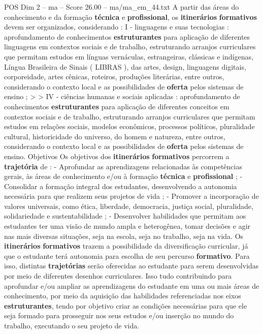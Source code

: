 \begin{textsample}{POS Dim 2 – ma – Score 26.00 – ma/ma\_em\_44.txt}
A partir das áreas do conhecimento e da formação \textbf{técnica} e \textbf{profissional}, os \textbf{itinerários} \textbf{formativos} devem ser organizados, considerando : I - linguagens e suas tecnologias : aprofundamento de conhecimentos \textbf{estruturantes} para aplicação de diferentes linguagens em contextos sociais e de trabalho, estruturando arranjos curriculares que permitam estudos em línguas vernáculas, estrangeiras, clássicas e indígenas, Língua Brasileira de Sinais ( LIBRAS ), das artes, design, linguagens digitais, corporeidade, artes cênicas, roteiros, produções literárias, entre outros, considerando o contexto local e as possibilidades de \textbf{oferta} pelos sistemas de ensino ; > > IV - ciências humanas e sociais aplicadas : aprofundamento de conhecimentos \textbf{estruturantes} para aplicação de diferentes conceitos em contextos sociais e de trabalho, estruturando arranjos curriculares que permitam estudos em relações sociais, modelos econômicos, processos políticos, pluralidade cultural, historicidade do universo, do homem e natureza, entre outros, considerando o contexto local e as possibilidades de \textbf{oferta} pelos sistemas de ensino.
Objetivos Os objetivos dos \textbf{itinerários} \textbf{formativos} percorrem a \textbf{trajetória} de : - Aprofundar as aprendizagens relacionadas às competências gerais, às áreas de conhecimento e/ou à formação \textbf{técnica} e \textbf{profissional} ; - Consolidar a formação integral dos estudantes, desenvolvendo a autonomia necessária para que realizem seus projetos de vida ; - Promover a incorporação de valores universais, como ética, liberdade, democracia, justiça social, pluralidade, solidariedade e sustentabilidade ; - Desenvolver habilidades que permitam aos estudantes ter uma visão de mundo ampla e heterogênea, tomar decisões e agir nas mais diversas situações, seja na escola, seja no trabalho, seja na vida.
Os \textbf{itinerários} \textbf{formativos} trazem a possibilidade da diversificação curricular, já que o estudante terá autonomia para escolha de seu percurso \textbf{formativo}.
Para isso, distintas \textbf{trajetórias} serão oferecidas ao estudante para serem desenvolvidas por meio de diferentes desenhos curriculares.
Isso tudo contribuindo para aprofundar e/ou ampliar as aprendizagens do estudante em uma ou mais áreas de conhecimento, por meio da aquisição das habilidades referenciadas nos eixos \textbf{estruturantes}, tendo por objetivo criar as condições necessárias para que ele seja formado para prosseguir nos seus estudos e/ou inserção no mundo do trabalho, executando o seu projeto de vida.

\end{textsample}
